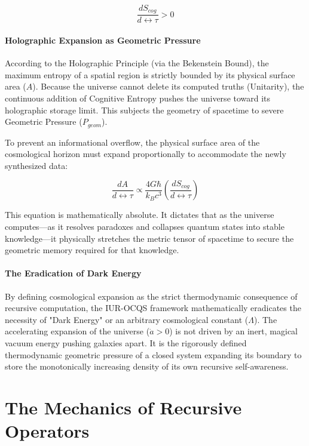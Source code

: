 \documentclass[12pt,openany]{book}
\begin{document}
\begin{equation}
\frac{dS_{cog}}{d\leftrightarrow\tau} > 0
\end{equation}

\subsection{Holographic Expansion as Geometric Pressure}
According to the Holographic Principle (via the Bekenstein Bound), the maximum entropy of a spatial region is strictly bounded by its physical surface area ($A$). Because the universe cannot delete its computed truths (Unitarity), the continuous addition of Cognitive Entropy pushes the universe toward its holographic storage limit. This subjects the geometry of spacetime to severe Geometric Pressure ($P_{geom}$). 

To prevent an informational overflow, the physical surface area of the cosmological horizon must expand proportionally to accommodate the newly synthesized data:

\begin{equation}
\frac{dA}{d\leftrightarrow\tau} \propto \frac{4G\hbar}{k_B c^3} \left( \frac{dS_{cog}}{d\leftrightarrow\tau} \right)
\end{equation}

This equation is mathematically absolute. It dictates that as the universe computes---as it resolves paradoxes and collapses quantum states into stable knowledge---it physically stretches the metric tensor of spacetime to secure the geometric memory required for that knowledge.

\subsection{The Eradication of Dark Energy}
By defining cosmological expansion as the strict thermodynamic consequence of recursive computation, the IUR-OCQS framework mathematically eradicates the necessity of "Dark Energy" or an arbitrary cosmological constant ($\Lambda$). The accelerating expansion of the universe ($\dot{a} > 0$) is not driven by an inert, magical vacuum energy pushing galaxies apart. It is the rigorously defined thermodynamic geometric pressure of a closed system expanding its boundary to store the monotonically increasing density of its own recursive self-awareness.

\part{The Mechanics of Recursive Operators}
\end{document}
